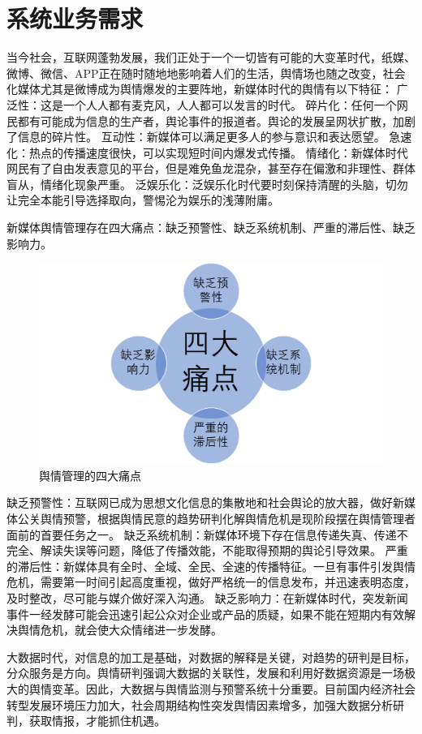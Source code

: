 \section{系统业务需求}
当今社会，互联网蓬勃发展，我们正处于一个一切皆有可能的大变革时代，纸媒、微博、微信、APP正在随时随地地影响着人们的生活，舆情场也随之改变，社会化媒体尤其是微博成为舆情爆发的主要阵地，新媒体时代的舆情有以下特征：
广泛性：这是一个人人都有麦克风，人人都可以发言的时代。
碎片化：任何一个网民都有可能成为信息的生产者，舆论事件的报道者。舆论的发展呈网状扩散，加剧了信息的碎片性。
互动性：新媒体可以满足更多人的参与意识和表达愿望。
急速化：热点的传播速度很快，可以实现短时间内爆发式传播。
情绪化：新媒体时代网民有了自由发表意见的平台，但是难免鱼龙混杂，甚至存在偏激和非理性、群体盲从，情绪化现象严重。
泛娱乐化：泛娱乐化时代要时刻保持清醒的头脑，切勿让完全本能引导选择取向，警惕沦为娱乐的浅薄附庸。

新媒体舆情管理存在四大痛点：缺乏预警性、缺乏系统机制、严重的滞后性、缺乏影响力。
\begin{figure}[!htb]
	\centering
	\includegraphics[scale=1]{image/业务需求.png}
	\caption{舆情管理的四大痛点}
\end{figure}
缺乏预警性：互联网已成为思想文化信息的集散地和社会舆论的放大器，做好新媒体公关舆情预警，根据舆情民意的趋势研判化解舆情危机是现阶段摆在舆情管理者面前的首要任务之一。
缺乏系统机制：新媒体环境下存在信息传递失真、传递不完全、解读失误等问题，降低了传播效能，不能取得预期的舆论引导效果。
严重的滞后性：新媒体具有全时、全域、全民、全速的传播特征。一旦有事件引发舆情危机，需要第一时间引起高度重视，做好严格统一的信息发布，并迅速表明态度，及时整改，尽可能与媒介做好深入沟通。
缺乏影响力：在新媒体时代，突发新闻事件一经发酵可能会迅速引起公众对企业或产品的质疑，如果不能在短期内有效解决舆情危机，就会使大众情绪进一步发酵。

大数据时代，对信息的加工是基础，对数据的解释是关键，对趋势的研判是目标，分众服务是方向。舆情研判强调大数据的关联性，发展和利用好数据资源是一场极大的舆情变革。因此，大数据与舆情监测与预警系统十分重要。目前国内经济社会转型发展环境压力加大，社会周期结构性突发舆情因素增多，加强大数据分析研判，获取情报，才能抓住机遇。

